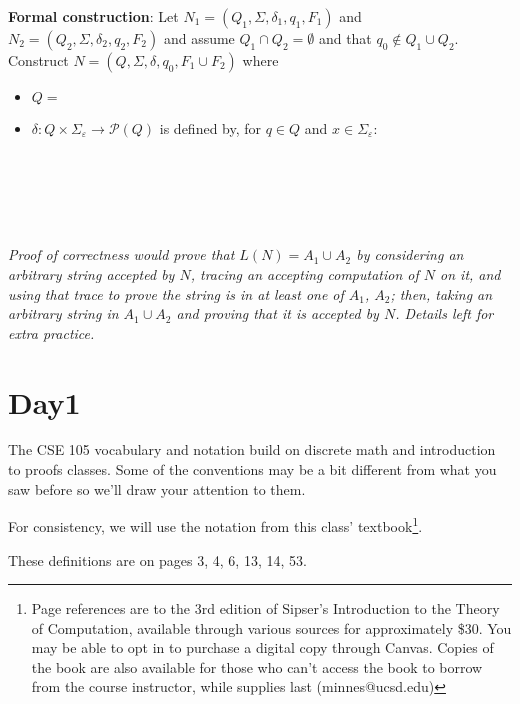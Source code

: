 \documentclass[12pt, oneside]{article}
\begin{document}
{\bf Formal construction}: Let 
$N_1 = (Q_1, \Sigma, \delta_1, q_1, F_1)$ and $N_2 = (Q_2, \Sigma, \delta_2,q_2, F_2)$
and assume $Q_1 \cap Q_2 = \emptyset$ and that $q_0 \notin Q_1 \cup Q_2$.
Construct $N = (Q, \Sigma, \delta, q_0, F_1 \cup F_2)$ where
\begin{itemize}
    \item $Q = $
    \item $\delta: Q \times \Sigma_\varepsilon \to \mathcal{P}(Q)$ is defined by, for $q \in Q$ and $x \in \Sigma_{\varepsilon}$:
        \[
            \phantom{\delta((q,x))=\begin{cases}  \delta_1 ((q,x)) &\qquad\text{if } q\in Q_1 \\ \delta_2 ((q,x)) &\qquad\text{if } q\in Q_2 \\ \{q1,q2\} &\qquad\text{if } q = q_0, x = \varepsilon \\ \emptyset\text{if } q= q_0, x \neq \varepsilon \end{cases}}
        \]
\end{itemize}


\vfill
{\it Proof of correctness would prove that $L(N) = A_1 \cup A_2$ by considering
an arbitrary string accepted by $N$, tracing an accepting computation of $N$ on it, and using 
that trace to prove the string is in at least one of $A_1$, $A_2$; then, taking an arbitrary 
string in $A_1 \cup A_2$ and proving that it is accepted by $N$. Details left for extra practice.}
 \vfill
\section*{Day1}


The CSE 105 vocabulary and notation build on discrete
math and introduction to proofs classes.  Some of the conventions may 
be a bit different from what you saw before so we'll draw your attention to them.

For consistency, we will use the notation from this class' textbook\footnote{Page references are to 
the 3rd edition of Sipser's Introduction to the Theory of Computation,
available through various sources for approximately \$30. You may be able to 
opt in to purchase a digital copy through Canvas. Copies of the book are also available 
for those who can't access the book
to borrow from the course instructor, while supplies last (minnes@ucsd.edu)}.

These definitions are on pages 3, 4, 6, 13, 14, 53.
\end{document}
